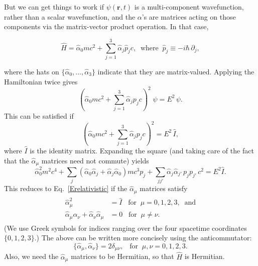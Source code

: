 \documentclass[prx,12pt]{revtex4-2}
\begin{document}
But we can get things to work if $\psi(\mathbf{r},t)$ is a
multi-component wavefunction, rather than a scalar wavefunction, and
the $\alpha$'s are matrices acting on those components via the
matrix-vector product operation.  In that case,
\begin{framed}
  \begin{equation}
    \hat{H} = \hat{\alpha}_0 mc^2 + \sum_{j=1}^3 \hat{\alpha}_j \hat{p}_j c,
    \;\; \mathrm{where}\;\; \hat{p}_j \equiv -i\hbar\, \partial_j,
    \label{Dirac}
  \end{equation}
\end{framed}
\vskip -0.15in
\noindent
where the hats on $\{\hat{\alpha}_0, \dots, \hat{\alpha}_3\}$ indicate
that they are matrix-valued.  Applying the Hamiltonian twice gives
\begin{equation}
  \left(\hat{\alpha}_0mc^2 + \sum_{j=1}^3\hat{\alpha}_j p_j c\right)^{\!2}\;
  \psi = E^2\,\psi.
\end{equation}
This can be satisfied if
\begin{equation}
  \left(\hat{\alpha}_0 mc^2 + \sum_{j=1}^3\hat{\alpha}_j p_j c\right)^2
  = E^2\, \hat{I},
\end{equation}
where $\hat{I}$ is the identity matrix.  Expanding the square (and
taking care of the fact that the $\hat{\alpha}_\mu$ matrices need not
commute) yields
\begin{equation}
  \hat{\alpha}_0^2 m^2c^4
  + \sum_j \left(\hat{\alpha}_0 \hat{\alpha}_j + \hat{\alpha}_j \hat{\alpha}_0\right) mc^3 p_j
  + \sum_{jj'} \hat{\alpha}_j \hat{\alpha}_{j'} \, p_j p_{j'} \,c^2 = E^2\hat{I}.
\end{equation}
This reduces to Eq.~\eqref{Erelativistic} if the $\hat{\alpha}_\mu$
matrices satisfy
\begin{align}
  \begin{aligned}
    \hat{\alpha}_\mu^2 &= \hat{I} \;\;\; \textrm{for} \;\;\mu=0,1,2,3,
    \;\;\textrm{and} \\
    \hat{\alpha}_\mu \hat{\alpha}_\nu
    + \hat{\alpha}_\nu \hat{\alpha}_\mu &= 0
    \;\;\; \textrm{for} \;\;\mu \ne \nu.
  \end{aligned}
\end{align}
(We use Greek symbols for indices ranging over the four spacetime
coordinates $\{0,1,2,3\}$.)  The above can be written more concisely
using the anticommutator:
\begin{equation}
  \{\hat{\alpha}_\mu, \hat{\alpha}_\nu\} = 2\delta_{\mu\nu},
  \;\;\; \textrm{for} \;\;\mu,\nu=0,1,2,3.
  \label{Dirac_anticomm}
\end{equation}
Also, we need the $\hat{\alpha}_\mu$ matrices to be Hermitian, so that
$\hat{H}$ is Hermitian.
\end{document}

